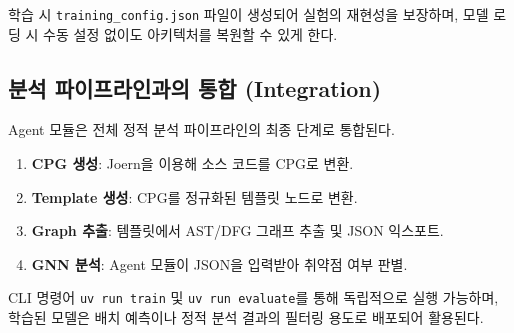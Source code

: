 학습 시 \texttt{training\_config.json} 파일이 생성되어 실험의 재현성을 보장하며, 모델 로딩 시 수동 설정 없이도 아키텍처를 복원할 수 있게 한다.



\subsection{분석 파이프라인과의 통합 (Integration)}

Agent 모듈은 전체 정적 분석 파이프라인의 최종 단계로 통합된다.

\begin{enumerate}
    \item \textbf{CPG 생성}: Joern을 이용해 소스 코드를 CPG로 변환.
    \item \textbf{Template 생성}: CPG를 정규화된 템플릿 노드로 변환.
    \item \textbf{Graph 추출}: 템플릿에서 AST/DFG 그래프 추출 및 JSON 익스포트.
    \item \textbf{GNN 분석}: Agent 모듈이 JSON을 입력받아 취약점 여부 판별.
\end{enumerate}

CLI 명령어 \texttt{uv run train} 및 \texttt{uv run evaluate}를 통해 독립적으로 실행 가능하며, 학습된 모델은 배치 예측이나 정적 분석 결과의 필터링 용도로 배포되어 활용된다.